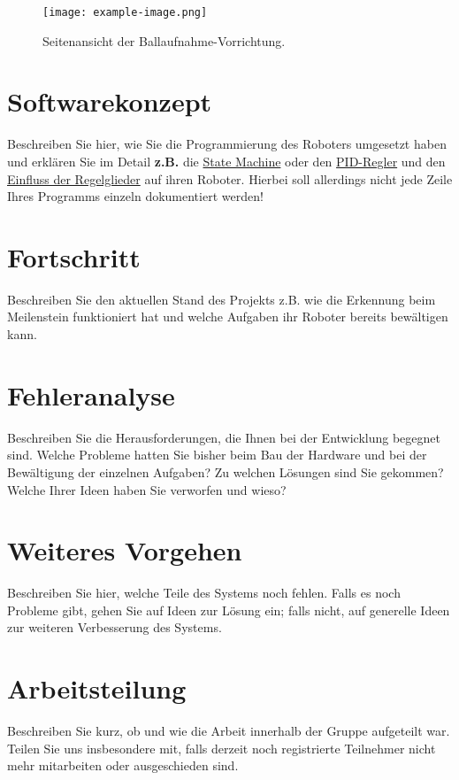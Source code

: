 \documentclass[12pt]{article}
\begin{document}
\begin{figure}[H]
  \centering
  \texttt{[image: example-image.png]}
  \caption{Seitenansicht der Ballaufnahme-Vorrichtung.}
  \label{Figure:BallLoading}
\end{figure}


\section{Softwarekonzept}
Beschreiben Sie hier, wie Sie die Programmierung des Roboters umgesetzt haben und erklären Sie im Detail \textbf{z.B.} die \href{https://de.wikipedia.org/wiki/Endlicher_Automat}{State Machine} oder den \href{https://studyflix.de/informatik/pid-regler-1450}{PID-Regler} und den \href{https://www.youtube.com/watch?v=Qm8jX0L9oSQ&t=525s}{Einfluss der Regelglieder} auf ihren Roboter. Hierbei soll allerdings nicht jede Zeile Ihres Programms einzeln dokumentiert werden!

\section{Fortschritt}
Beschreiben Sie den aktuellen Stand des Projekts z.B. wie die Erkennung beim Meilenstein funktioniert hat und welche Aufgaben ihr Roboter bereits bewältigen kann.


\section{Fehleranalyse}
Beschreiben Sie die Herausforderungen, die Ihnen bei der Entwicklung begegnet sind. Welche Probleme hatten Sie bisher beim Bau der Hardware und bei der Bewältigung der einzelnen Aufgaben? Zu welchen Lösungen sind Sie gekommen? Welche Ihrer Ideen haben Sie verworfen und wieso?


\section{Weiteres Vorgehen}
Beschreiben Sie hier, welche Teile des Systems noch fehlen. Falls es noch Probleme gibt, gehen Sie auf Ideen zur Lösung ein; falls nicht, auf generelle Ideen zur weiteren Verbesserung des Systems.


\section{Arbeitsteilung}
Beschreiben Sie kurz, ob und wie die Arbeit innerhalb der Gruppe aufgeteilt war. Teilen Sie uns insbesondere mit, falls derzeit noch registrierte Teilnehmer nicht mehr mitarbeiten oder ausgeschieden sind.
\end{document}
